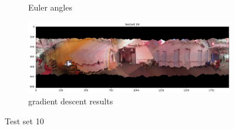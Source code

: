 \documentclass[conference]{IEEEtran}
\begin{document}
\begin{figure}[h]
\begin{subfigure}{0.4\textwidth}
        \caption{Euler angles}
    \end{subfigure}
    \begin{subfigure}{0.4\textwidth}
        \includegraphics[width=\linewidth]{../img/pano_10_gd.png}
        \caption{gradient descent results}
    \end{subfigure}
    \caption{Test set 10}
    \label{fig:set10}
\end{figure}
\end{document}
